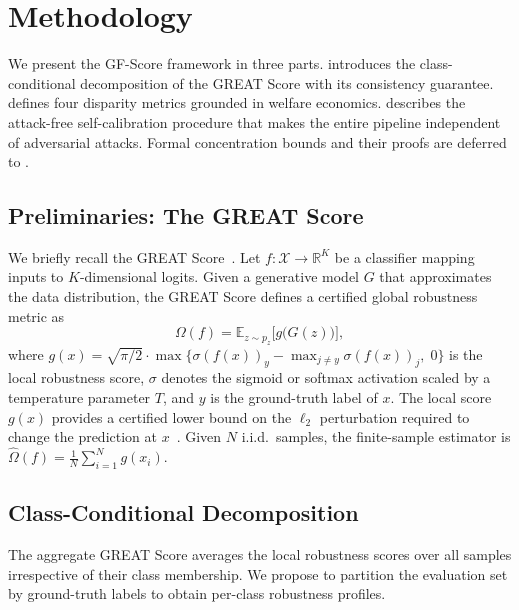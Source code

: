 \section{Methodology}
\label{sec:method}

We present the GF-Score framework in three parts.  introduces the class-conditional decomposition of the GREAT Score with its consistency guarantee.  defines four disparity metrics grounded in welfare economics.  describes the attack-free self-calibration procedure that makes the entire pipeline independent of adversarial attacks. Formal concentration bounds and their proofs are deferred to .

\subsection{Preliminaries: The GREAT Score}
\label{sec:prelim}

We briefly recall the GREAT Score~\citep{li2024greatscoreglobalrobustness}. Let $f: \mathcal{X} \to \mathbb{R}^K$ be a classifier mapping inputs to $K$-dimensional logits. Given a generative model $G$ that approximates the data distribution, the GREAT Score defines a certified global robustness metric as
\begin{equation}
    \Omega(f) = \mathbb{E}_{z \sim p_z}\bigl[g\bigl(G(z)\bigr)\bigr],
    \label{eq:great_score}
\end{equation}
where $g(x) = \sqrt{\pi/2} \cdot \max\bigl\{\sigma(f(x))_{y} - \max_{j \neq y} \sigma(f(x))_j,\; 0\bigr\}$ is the local robustness score, $\sigma$ denotes the sigmoid or softmax activation scaled by a temperature parameter $T$, and $y$ is the ground-truth label of $x$. The local score $g(x)$ provides a certified lower bound on the $\ell_2$ perturbation required to change the prediction at $x$~\citep{li2024greatscoreglobalrobustness}. Given $N$ i.i.d.\ samples, the finite-sample estimator is $\hat{\Omega}(f) = \frac{1}{N}\sum_{i=1}^{N} g(x_i)$.

\subsection{Class-Conditional Decomposition}
\label{sec:decomposition}

The aggregate GREAT Score averages the local robustness scores over all samples irrespective of their class membership. We propose to partition the evaluation set by ground-truth labels to obtain per-class robustness profiles.

